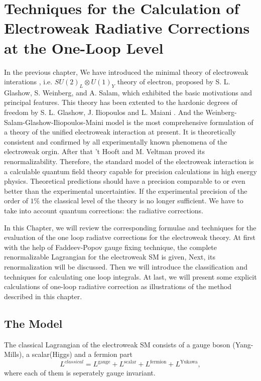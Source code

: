 
\chapter{Techniques for the Calculation of Electroweak Radiative Corrections at the One-Loop Level}

In the previous chapter, We have introduced the minimal theory of electroweak interations , i.e. $SU(2)_L\otimes U(1)_Y$ theory of electron, proposed by S. L. Glashow\cite{Glashow1961}, S. Weinberg\cite{Weinberg}, and A. Salam\cite{Salam}, which exhibited the basic motivations and principal features. This theory has been extented to the hardonic degrees of freedom by S. L. Glashow, J. Iliopoulos and L. Maiani \cite{GIM}.
And the Weinberg-Salam-Glashow-Iliopoulos-Maini model is the most comprehensive formulation of a theory of the unified electroweak interaction at present. It is theoretically consistent and confirmed by all experimentally known phenomena of the electroweak orgin. After that 't Hooft and M. Veltman proved its renormalizability\cite{thooft1,thooft2,tHooftVeltman,tHV}. Therefore, the standard model of the electroweak interaction is a calculable quantum field theory capable for precision calculations in high energy physics. Theoretical predictions should have a precision comparable to or even better than the experimental uncertainties. If the experimental precision of the order of $1\%$ the classical level of the theory is no longer sufficient. We have to take into account quantum corrections: the radiative corrections. 

In this Chapter, we will review the corresponding formulae and techniques for the evaluation of the one loop radiatve corrections for the electroweak theory\cite{Denner,PV,DG,Consoli,MV,GV,BRJ,SovJ}. At first with the help of Faddeev-Popov gauge fixing technique, the complete renormalizable Lagrangian for the electroweak SM is given, Next, its renormalization will be discussed. Then we will introduce the classification and techniques for calculating one loop integrals.
At last, we will present some explicit calculations of one-loop radiative correction as illustrations of the method described in this chapter.

\section{The Model}

The classical Lagrangian of the electroweak SM consists of a gauge boson (Yang-Mills), a scalar(Higgs) and a fermion part
\begin{equation}
L^{classical}=L^{\text{gauge}}+L^\text{scalar}+L^{\text{fermion}}+L^\text{Yukawa}, 
\end{equation}
where each of them is seperately gauge invariant. 

